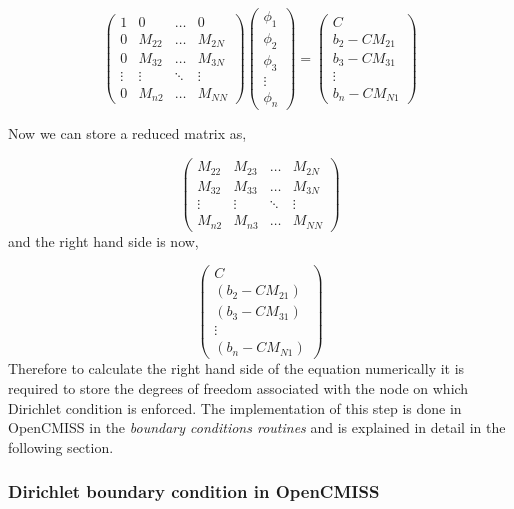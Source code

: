 \[ \left( \begin{array}{cccc}
1 & 0 & \hdots& 0 \\
0 & M_{22} & \hdots& M_{2N} \\
0 & M_{32} & \hdots& M_{3N} \\
 \vdots& \vdots& \ddots& \vdots\\
0 & M_{n2} & \hdots & M_{NN} \end{array} \right) \left( \begin{array}{c}
\phi_{1} \\
\phi_{2} \\
\phi_{3} \\
 \vdots\\ 
\phi_{n} \end{array} \right) = \left( \begin{array}{c}
C \\
b_{2} - C M_{21} \\
b_{3} - C M_{31}\\
 \vdots\\
b_{n} - C M_{N1} \end{array} \right) \] 

Now we can store a reduced matrix as,

\[ \left( \begin{array}{cccc}
M_{22} & M_{23} & \hdots& M_{2N} \\
M_{32} & M_{33} & \hdots& M_{3N} \\
 \vdots& \vdots& \ddots& \vdots\\
M_{n2} & M_{n3} & \hdots & M_{NN} \end{array} \right)
\] 
and the right hand side is now, 

\[\left( \begin{array}{c}
C \\
(b_{2} - C M_{21}) \\
(b_{3} - C M_{31})\\
 \vdots\\
(b_{n} - C M_{N1}) \end{array} \right)
\] 
Therefore to calculate the right hand side of the equation numerically it is required to store the degrees of freedom associated 
with the node on which Dirichlet condition is enforced. The implementation of this step is done in OpenCMISS in the  \emph{boundary conditions routines}
 and is explained in detail in the following section. 

\subsubsection{Dirichlet boundary condition in OpenCMISS}

